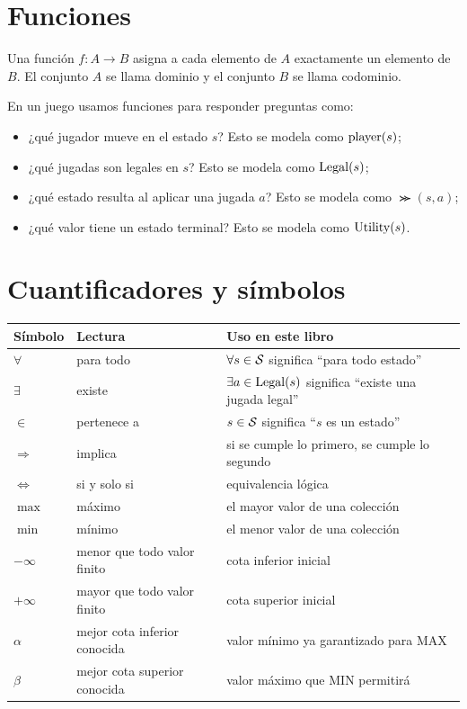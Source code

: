 \section{Funciones}

\begin{definition}[Función]
Una función $f:A\to B$ asigna a cada elemento de $A$ exactamente un elemento de $B$. El conjunto $A$ se llama dominio y el conjunto $B$ se llama codominio.
\end{definition}

En un juego usamos funciones para responder preguntas como:

\begin{itemize}[nosep]
\item ¿qué jugador mueve en el estado $s$? Esto se modela como $\operatorname{player}(s)$;
\item ¿qué jugadas son legales en $s$? Esto se modela como $\operatorname{Legal}(s)$;
\item ¿qué estado resulta al aplicar una jugada $a$? Esto se modela como $\Succ(s,a)$;
\item ¿qué valor tiene un estado terminal? Esto se modela como $\operatorname{Utility}(s)$.
\end{itemize}

\section{Cuantificadores y símbolos}

\begin{center}
\begin{tabular}{lll}
\toprule
Símbolo & Lectura & Uso en este libro\\
\midrule
$\forall$ & para todo & $\forall s\in\mathcal{S}$ significa ``para todo estado''\\
$\exists$ & existe & $\exists a\in\operatorname{Legal}(s)$ significa ``existe una jugada legal''\\
$\in$ & pertenece a & $s\in\mathcal{S}$ significa ``$s$ es un estado''\\
$\Rightarrow$ & implica & si se cumple lo primero, se cumple lo segundo\\
$\Leftrightarrow$ & si y solo si & equivalencia lógica\\
$\max$ & máximo & el mayor valor de una colección\\
$\min$ & mínimo & el menor valor de una colección\\
$-\infty$ & menor que todo valor finito & cota inferior inicial\\
$+\infty$ & mayor que todo valor finito & cota superior inicial\\
$\alpha$ & mejor cota inferior conocida & valor mínimo ya garantizado para MAX\\
$\beta$ & mejor cota superior conocida & valor máximo que MIN permitirá\\
\bottomrule
\end{tabular}
\end{center}


